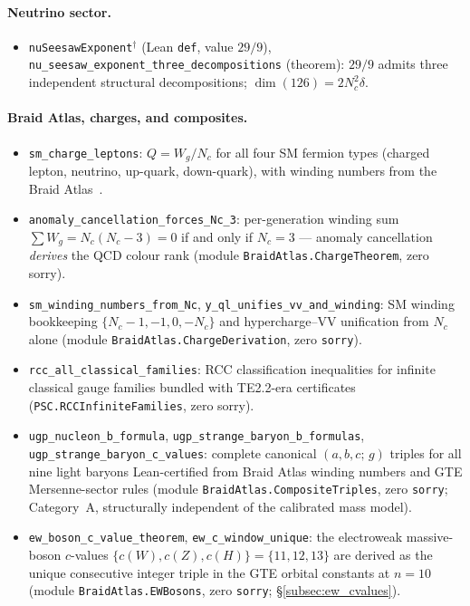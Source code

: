 \documentclass[11pt]{article}
\theoremstyle{remark}
\begin{document}
\begin{appendices}
\paragraph{Neutrino sector.}
\begin{itemize}[leftmargin=1.2em,itemsep=0.1em,topsep=0.2em]
  \item \texttt{nuSeesawExponent}$^{\dagger}$ (Lean \texttt{def}, value $29/9$), \texttt{nu\_seesaw\_exponent\_three\_de\-com\-po\-si\-tions} (theorem): $29/9$ admits three independent structural decompositions; $\dim(126) = 2N_c^2\delta$.
\end{itemize}

\paragraph{Braid Atlas, charges, and composites.}
\begin{itemize}[leftmargin=1.2em,itemsep=0.1em,topsep=0.2em]
  \item \texttt{sm\_charge\_leptons}: $Q = W_g / N_c$ for all four SM fermion types (charged lepton, neutrino, up-quark, down-quark), with winding numbers from the Braid Atlas~\cite{SpivackBraidAtlas}.
  \item \texttt{anomaly\_cancellation\_forces\_Nc\_3}: per-generation winding sum $\sum W_g = N_c(N_c-3) = 0$ if and only if $N_c = 3$ --- anomaly cancellation \emph{derives} the QCD colour rank (module \texttt{BraidAtlas.ChargeTheorem}, zero sorry).
  \item \texttt{sm\_winding\_numbers\_from\_Nc}, \texttt{y\_ql\_unifies\_vv\_and\_win\-ding}: SM winding bookkeeping $\{N_c{-}1,{-}1,0,{-}N_c\}$ and hypercharge--VV unification from $N_c$ alone (module \texttt{BraidAtlas.ChargeDerivation}, zero \texttt{sorry}).
  \item \texttt{rcc\_all\_classical\_families}: RCC classification inequalities for infinite classical gauge families bundled with TE2.2-era certificates (\texttt{PSC.RCCInfiniteFamilies}, zero sorry).
  \item \texttt{ugp\_nucleon\_b\_formula}, \texttt{ugp\_strange\_baryon\_b\_formulas}, \texttt{ugp\_strange\_baryon\_c\_values}: complete canonical $(a,b,c;\,g)$ triples for all nine light baryons Lean-certified from Braid Atlas winding numbers and GTE Mersenne-sector rules (module \texttt{BraidAtlas.CompositeTriples}, zero \texttt{sorry}; Category~A, structurally independent of the calibrated mass model).
  \item \texttt{ew\_boson\_c\_value\_theorem}, \texttt{ew\_c\_window\_unique}: the electroweak massive-boson $c$-values $\{c(W),c(Z),c(H)\}=\{11,12,13\}$ are derived as the unique consecutive integer triple in the GTE orbital constants at $n{=}10$ (module \texttt{BraidAtlas.EWBosons}, zero \texttt{sorry}; \S\ref{subsec:ew_cvalues}).
\end{itemize}


\end{appendices}
\end{document}
